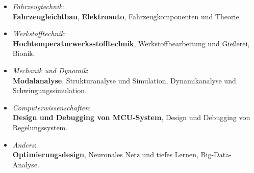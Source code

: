 \documentclass{resume}
\begin{document}
\begin{itemize}
	\setlength{\itemsep}{4pt}
	
  \item {\large \textit{Fahrzeugtechnik}\hspace{1mm}:}\\[1mm]
	{\large \textbf{Fahrzeugleichtbau}, \hspace{1mm} \textbf{Elektroauto}, \hspace{1mm} Fahrzeugkomponenten und Theorie.}
	
  \item {\large \textit{Werkstofftechnik}\hspace{1mm}:}\\[1mm]
	{\large \textbf{Hochtemperaturwerksstofftechnik}, \hspace{1mm} Werkstoffbearbeitung und Gießerei, \hspace{1mm} Bionik.}
	
  \item {\large \textit{Mechanik und Dynamik}\hspace{1mm}:} \\[1mm]
	{\large \textbf{Modalanalyse},\hspace{1mm} Strukturanalyse und Simulation,\hspace{1mm} Dynamikanalyse und Schwingungs\-simulation.}
	
  \item {\large \textit{Computerwissenschaften}\hspace{1mm}:} \\[1mm]
	{\large \textbf{Design und Debugging von MCU-System}, Design und Debugging von Regelungssystem.}
	
  \item {\large \textit{Anders}\hspace{1mm}:} \\[1mm]
	{\large \textbf{Optimierungsdesign},\hspace{1mm} Neuronales Netz und tiefes Lernen, \hspace{1mm} Big-Data-Analyse.}
\end{itemize}
\end{document}
